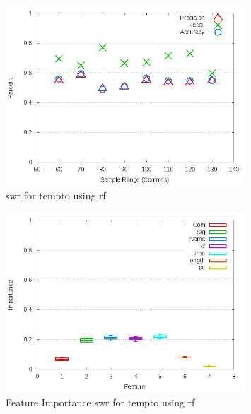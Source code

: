 \clearpage
\begin{figure}[!t]
\centering
\includegraphics[width=0.8\textwidth]{images/rf/test_1/tempto_sample_range.png}
\caption{\gls{swr} for tempto using \gls{rf}}
\label{fig:test_1_tempto_rf}
\end{figure}

\begin{figure}[!t]
\centering
\includegraphics[width=0.8\textwidth]{images/rf/test_1/tempto_importance.png}
\caption{Feature Importance \gls{swr} for tempto using \gls{rf}}
\label{fig:test_1_tempto_rf_importance}
\end{figure}

